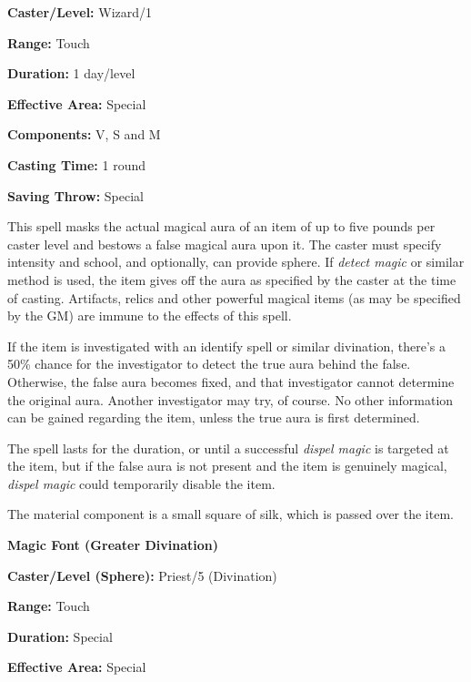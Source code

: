 \begin{multicols}{2}
\begin{minipage}{\columnwidth}
\noindent \textbf{Caster/Level:} Wizard/1

\noindent \textbf{Range:} Touch

\noindent \textbf{Duration:} 1 day/level

\noindent \textbf{Effective Area:} Special

\noindent \textbf{Components:} V, S and M

\noindent \textbf{Casting Time:} 1 round

\noindent \textbf{Saving Throw:} Special

\end{minipage}

This spell masks the actual magical aura of an item of up to five pounds per caster level and bestows a false magical aura upon it.  The caster must specify intensity and school, and optionally, can provide sphere.  If \textit{detect magic} or similar method is used, the item gives off the aura as specified by the caster at the time of casting.  Artifacts, relics and other powerful magical items (as may be specified by the GM) are immune to the effects of this spell.

If the item is investigated with an identify spell or similar divination, there's a 50\% chance for the investigator to detect the true aura behind the false.  Otherwise, the false aura becomes fixed, and that investigator cannot determine the original aura.  Another investigator may try, of course.  No other information can be gained regarding the item, unless the true aura is first determined.  

The spell lasts for the duration, or until a successful \textit{dispel magic} is targeted at the item, but if the false aura is not present and the item is genuinely magical, \textit{dispel magic} could temporarily disable the item.

The material component is a small square of silk, which is passed over the item.

\vspace{1em}

\noindent
\begin{minipage}{\columnwidth}

\noindent \textbf{Magic Font (Greater Divination)}

\noindent \textbf{Caster/Level (Sphere):} Priest/5 (Divination)

\noindent \textbf{Range:} Touch

\noindent \textbf{Duration:} Special

\noindent \textbf{Effective Area:} Special


\end{minipage}
\end{multicols}
